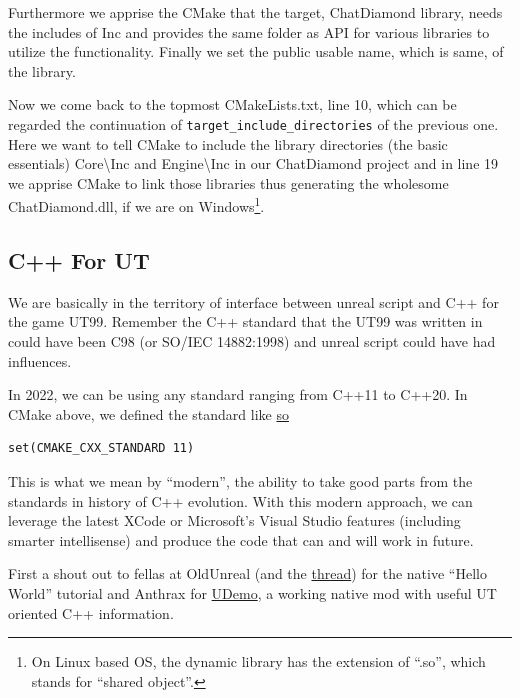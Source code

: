 \documentclass{article}
\theoremstyle{definition}
\newcommand{\FileColor}[1]{{\color{Purple} #1}}
\newcommand{\FolderColor}[1]{{\color{mygray} #1}}
\begin{document}
Furthermore we apprise the CMake that the target, ChatDiamond library, needs the includes of \FolderColor{Inc} and provides the same folder as API for various libraries to utilize the functionality.  Finally we set the public usable name, which is same, of the library.

Now we come back to the topmost \FileColor{CMakeLists.txt}, line 10, which can be regarded the continuation of \texttt{target\_include\_directories} of the previous one.  Here we want to tell CMake to include the library directories (the basic essentials) \FolderColor{Core\textbackslash Inc} and \FolderColor{Engine\textbackslash Inc} in our ChatDiamond project and in line 19 we apprise CMake to link those libraries thus generating the wholesome \FileColor{ChatDiamond.dll}, if we are on Windows\footnote{On Linux based OS, the dynamic library has the extension of ``.so'', which stands for ``shared object''.}.

\subsection{C++ For UT}
We are basically in the territory of interface between unreal script and C++ for the game UT99.  Remember the C++ standard that the UT99 was written in could have been C98 (or SO/IEC 14882:1998) and unreal script could have had influences.

In 2022, we can be using any standard ranging from C++11 to C++20.  In CMake above, we defined the standard like \href{https://github.com/ravimohan1991/ChatDiamond/blob/f7950b2591b93a54600459ec58d7ddf57fe9218d/UTNativeEssentials/CMakeLists.txt#L11}{so}

\lstset{language=[5.0]Lua}
\begin{lstlisting}[frame=single]
set(CMAKE_CXX_STANDARD 11)
\end{lstlisting}

This is what we mean by ``modern'', the ability to take good parts from the standards in history of C++ evolution.  With this modern approach, we can leverage the latest  XCode or Microsoft's Visual Studio features (including smarter intellisense) and produce the code that can and will work in future. 

First a shout out to fellas at OldUnreal (and the \href{https://www.oldunreal.com/phpBB3/viewtopic.php?f=37&t=3938}{thread}) for the native ``Hello World'' tutorial and Anthrax for \href{https://github.com/stijn-volckaert/udemo}{UDemo}, a working native mod with useful UT oriented C++ information.
\end{document}
